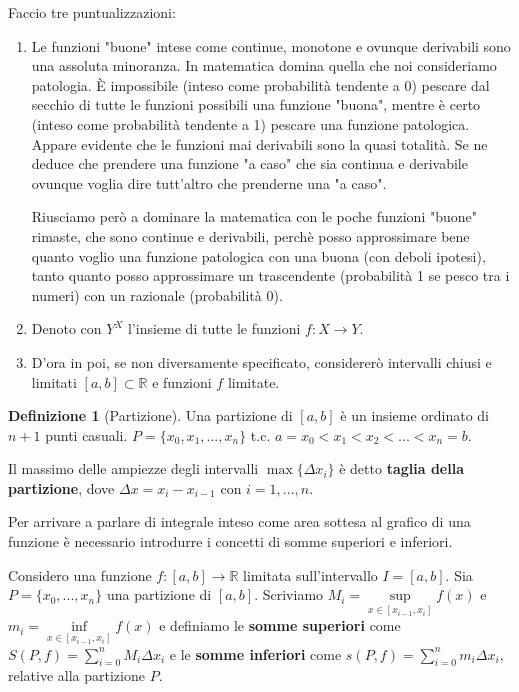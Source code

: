 \documentclass{article}
\theoremstyle{definition}
\theoremstyle{definition}
\theoremstyle{definition}
\newtheorem{definition}{Definizione}[section]
\theoremstyle{definition}
\theoremstyle{definition}
\theoremstyle{definition}
\begin{document}
Faccio tre puntualizzazioni:
\begin{enumerate}
    \item Le funzioni "buone" intese come continue, monotone e ovunque derivabili sono una assoluta minoranza. In matematica domina quella che noi consideriamo patologia. È impossibile (inteso come probabilità tendente a 0) pescare dal secchio di tutte le funzioni possibili una funzione "buona", mentre è certo (inteso come probabilità tendente a 1) pescare una funzione patologica. Appare evidente che le funzioni mai derivabili sono la quasi totalità. Se ne deduce che prendere una funzione "a caso" che sia continua e derivabile ovunque voglia dire tutt'altro che prenderne una "a caso". 
    
    Riusciamo però a dominare la matematica con le poche funzioni "buone" rimaste, che sono continue e derivabili, perchè posso approssimare bene quanto voglio una funzione patologica con una buona (con deboli ipotesi), tanto quanto posso approssimare un trascendente (probabilità 1 se pesco tra i numeri) con un razionale (probabilità 0).
    \item Denoto con $Y^{X}$ l'insieme di tutte le funzioni $f:X\rightarrow Y$.
    \item D'ora in poi, se non diversamente specificato, considererò intervalli chiusi e limitati $[a,b]\subset \mathbb{R}$ e funzioni $f$ limitate.
\end{enumerate}

\begin{definition}[Partizione]
    Una partizione di $[a,b]$ è un insieme ordinato di $n+1$ punti casuali. $P=\lbrace x_0,x_1, ...,x_n \rbrace$ t.c. $a=x_0 < x_1 < x_2 <...<x_n=b$.

    Il massimo delle ampiezze degli intervalli $\max\lbrace\Delta x_i\rbrace$ è detto \textbf{taglia della partizione}, dove $\Delta x= x_i - x_{i-1}$ con $i=1,... ,n$.
\end{definition}

Per arrivare a parlare di integrale inteso come area sottesa al grafico di una funzione è necessario introdurre i concetti di somme superiori e inferiori.

\vspace{5mm}

Considero una funzione $f:[a,b]\rightarrow \mathbb{R}$ limitata sull'intervallo $I=[a,b]$. Sia $P=\lbrace x_0,...,x_n \rbrace$ una partizione di $[a,b]$. Scriviamo $M_i=\underset{x\in [x_{i-1},x_i]}{\sup} f(x)$ e $m_i =\underset{x\in [x_{i-1},x_i]}{\inf} f(x)$ e definiamo le \textbf{somme superiori} come $S(P,f)=\displaystyle\sum_{i=0}^{n}M_i \Delta x_i$ e le \textbf{somme inferiori} come $s(P,f)=\displaystyle\sum_{i=0}^{n}m_i \Delta x_i$, relative alla partizione $P$.
\end{document}
